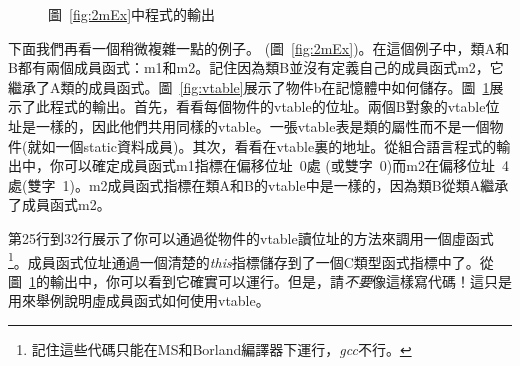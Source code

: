 \begin{figure}[tp]
\caption{圖~\ref{fig:2mEx}中程式的輸出 \label{fig:2mExOut}}
\end{figure}


下面我們再看一個稍微複雜一點的例子。
(圖~\ref{fig:2mEx})。在這個例子中，類{\code A}和{\code B}都有兩個成員函式：{\code m1}和{\code m2}。記住因為類{\code B}並沒有定義自己的成員函式{\code m2}，它繼承了{\code A}類的成員函式。圖~\ref{fig:vtable}展示了物件{\code b}在記憶體中如何儲存。圖~\ref{fig:2mExOut}展示了此程式的輸出。首先，看看每個物件的vtable的位址。兩個{\code B}對象的vtable位址是一樣的，因此他們共用同樣的vtable。一張vtable表是類的屬性而不是一個物件(就如一個{\code static}資料成員)。其次，看看在vtable裏的地址。從組合語言程式的輸出中，你可以確定成員函式{\code m1}指標在偏移位址~0處
(或雙字~0)而{\code m2}在偏移位址~4處(雙字~1)。{\code m2}成員函式指標在類{\code A}和{\code B}的vtable中是一樣的，因為類{\code B}從類{\code A}繼承了成員函式{\code m2}。

第25行到32行展示了你可以通過從物件的vtable讀位址的方法來調用一個虛函式\footnote{記住這些代碼只能在MS和Borland編譯器下運行，\emph{gcc}不行。}。成員函式位址通過一個清楚的\emph{this}指標儲存到了一個C類型函式指標中了。從圖~\ref{fig:2mExOut}的輸出中，你可以看到它確實可以運行。但是，請\emph{不要}像這樣寫代碼！這只是用來舉例說明虛成員函式如何使用vtable。


